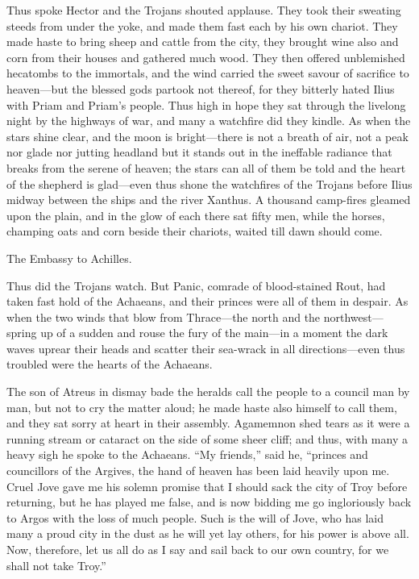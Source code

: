 Thus spoke Hector and the Trojans shouted applause. They took their
sweating steeds from under the yoke, and made them fast each by his own
chariot. They made haste to bring sheep and cattle from the city, they
brought wine also and corn from their houses and gathered much wood. They
then offered unblemished hecatombs to the immortals, and the wind carried
the sweet savour of sacrifice to heaven—but the blessed gods partook
not thereof, for they bitterly hated Ilius with Priam and Priam’s people.
Thus high in hope they sat through the livelong night by the highways of
war, and many a watchfire did they kindle. As when the stars shine clear,
and the moon is bright—there is not a breath of air, not a peak nor
glade nor jutting headland but it stands out in the ineffable radiance
that breaks from the serene of heaven; the stars can all of them be told
and the heart of the shepherd is glad—even thus shone the watchfires
of the Trojans before Ilius midway between the ships and the river
Xanthus. A thousand camp-fires gleamed upon the plain, and in the glow of
each there sat fifty men, while the horses, champing oats and corn beside
their chariots, waited till dawn should come.


The Embassy to Achilles.

Thus did the Trojans watch. But Panic, comrade of blood-stained Rout, had
taken fast hold of the Achaeans, and their princes were all of them in
despair. As when the two winds that blow from Thrace—the north and
the northwest—spring up of a sudden and rouse the fury of the main—in
a moment the dark waves uprear their heads and scatter their sea-wrack in
all directions—even thus troubled were the hearts of the Achaeans.

The son of Atreus in dismay bade the heralds call the people to a council
man by man, but not to cry the matter aloud; he made haste also himself to
call them, and they sat sorry at heart in their assembly. Agamemnon shed
tears as it were a running stream or cataract on the side of some sheer
cliff; and thus, with many a heavy sigh he spoke to the Achaeans. “My
friends,” said he, “princes and councillors of the Argives, the hand of
heaven has been laid heavily upon me. Cruel Jove gave me his solemn
promise that I should sack the city of Troy before returning, but he has
played me false, and is now bidding me go ingloriously back to Argos with
the loss of much people. Such is the will of Jove, who has laid many a
proud city in the dust as he will yet lay others, for his power is above
all. Now, therefore, let us all do as I say and sail back to our own
country, for we shall not take Troy.”

